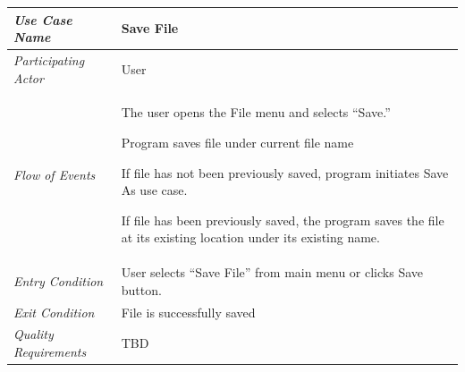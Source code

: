 \documentclass[twoside,letterpaper]{article}
\newenvironment{my_enumerate}{
\begin{enumerate}
  \setlength{\itemsep}{1pt}
  \setlength{\parskip}{0pt}
  \setlength{\parsep}{0pt}}{\end{enumerate}
}
\begin{document}
\begin{flushleft}
\tablehead{}
\begin{tabular}{|m{2.0in} m{5.0in}|}
\hline
{\bfseries\emph{Use Case Name}}
& {\bfseries Save File}
\\\hline
\emph{Participating Actor}
& User
\\\hline
\emph{Flow of Events}
& \begin{my_enumerate}
  \item The user opens the File menu and selects ``Save.''
  \item Program saves file under current file name 
\begin{my_enumerate}
\item If file has not been previously saved, program initiates Save As use case. 
\item If file has been previously saved, the program saves the file at its existing location under its existing name.
\end{my_enumerate}
\end{my_enumerate}
\\\hline
\emph{Entry Condition}
& User selects ``Save File'' from main menu or clicks Save button.
\\\hline
\emph{Exit Condition}
& File is successfully saved
\\\hline
\emph{Quality Requirements}
& TBD
\\\hline
\end{tabular}
\end{flushleft}
\bigskip
\end{document}
